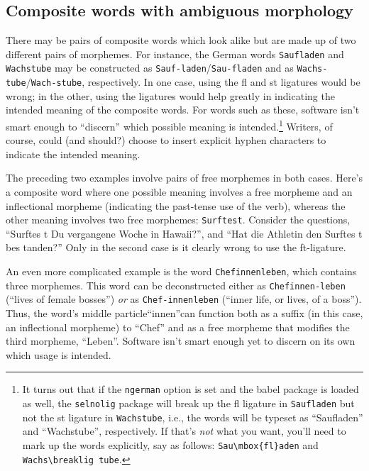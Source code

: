 \documentclass[11pt]{article}
\newcommand{\pkg}[1]{\textsf{#1}}
\newcommand{\opt}[1]{\texttt{#1}}
\begin{document}
\subsection{Composite words with ambiguous morphology}

There may be pairs of composite words which look alike but are made up of two different pairs of morphemes. For instance, the German words \opt{Saufladen} and \opt{Wachstube} may be constructed as \opt{Sauf-laden}\slash \opt{Sau-fladen} and as \opt{Wachs-tube}\slash \opt{Wach-stube}, respectively. In one case, using the fl and st ligatures would be wrong; in the other, using the ligatures would help greatly in indicating the intended meaning of the composite words. 
For words such as these, software isn't smart enough to \enquote{discern} which possible meaning is intended.\footnote{It turns out that if the \opt{ngerman} option is set and the \pkg{babel} package is loaded as well, the \opt{selnolig} package will break up the fl ligature in \opt{Saufladen} but not the st ligature in \opt{Wachstube}, i.e., the words will be typeset as \enquote{Saufladen} and \enquote{Wachstube}, respectively. If that's \emph{not} what you want, you'll need to mark up the words explicitly, say as follows: \Verb+Sau\mbox{fl}aden+ and \Verb+Wachs\breaklig tube+. } Writers, of course, could (and should?) choose to insert explicit hyphen characters to indicate the intended meaning.

The preceding two examples involve pairs of free morphemes in both cases. Here's a composite word where one possible meaning involves a free morpheme and an inflectional morpheme (indicating the past-tense use of the verb), whereas the other meaning involves two free morphemes: \opt{Surftest}. Consider the questions, \enquote{Surftes\kern0pt t Du vergangene Woche in Hawaii?}, and \enquote{Hat die Athletin den Surf\breaklig tes\kern0pt t bes\kern0pt tanden?} Only in the second case is it clearly wrong to use the ft-ligature.

An even more complicated example is the word \opt{Chefinnenleben}, which contains three morphemes. This word can be deconstructed either as \opt{Chefinnen-leben} (\enquote{lives of female bosses}) \emph{or} as \opt{Chef-innenleben} (\enquote{inner life, or lives, of a boss}). Thus, the word's middle particle\textemdash\enquote{innen}\textemdash can function both as a suffix (in this case, an inflectional morpheme) to \enquote{Chef} and as a free morpheme that modifies the third morpheme, \enquote{Leben}. Software isn't smart enough yet to discern on its own which usage is intended.
\end{document}
